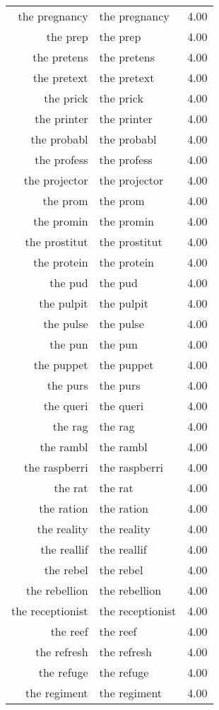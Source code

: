 \begin{table}[ht]
\begin{tabular}{rlr}
  the pregnancy & the pregnancy & 4.00 \\ 
  the prep & the prep & 4.00 \\ 
  the pretens & the pretens & 4.00 \\ 
  the pretext & the pretext & 4.00 \\ 
  the prick & the prick & 4.00 \\ 
  the printer & the printer & 4.00 \\ 
  the probabl & the probabl & 4.00 \\ 
  the profess & the profess & 4.00 \\ 
  the projector & the projector & 4.00 \\ 
  the prom & the prom & 4.00 \\ 
  the promin & the promin & 4.00 \\ 
  the prostitut & the prostitut & 4.00 \\ 
  the protein & the protein & 4.00 \\ 
  the pud & the pud & 4.00 \\ 
  the pulpit & the pulpit & 4.00 \\ 
  the pulse & the pulse & 4.00 \\ 
  the pun & the pun & 4.00 \\ 
  the puppet & the puppet & 4.00 \\ 
  the purs & the purs & 4.00 \\ 
  the queri & the queri & 4.00 \\ 
  the rag & the rag & 4.00 \\ 
  the rambl & the rambl & 4.00 \\ 
  the raspberri & the raspberri & 4.00 \\ 
  the rat & the rat & 4.00 \\ 
  the ration & the ration & 4.00 \\ 
  the reality & the reality & 4.00 \\ 
  the reallif & the reallif & 4.00 \\ 
  the rebel & the rebel & 4.00 \\ 
  the rebellion & the rebellion & 4.00 \\ 
  the receptionist & the receptionist & 4.00 \\ 
  the reef & the reef & 4.00 \\ 
  the refresh & the refresh & 4.00 \\ 
  the refuge & the refuge & 4.00 \\ 
  the regiment & the regiment & 4.00 \\ 

\end{tabular}
\end{table}
